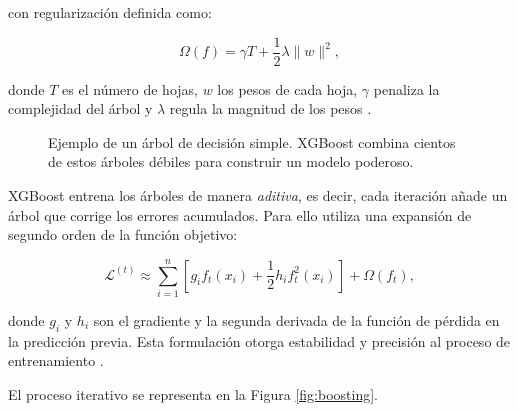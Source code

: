 con regularización definida como:

\begin{equation} 
\Omega(f) = \gamma T + \frac{1}{2}\lambda \|w\|^2, 
\end{equation}

donde $T$ es el número de hojas, $w$ los pesos de cada hoja, $\gamma$ penaliza la complejidad del árbol y $\lambda$ regula la magnitud de los pesos \cite{chen2016xgboost}.


\begin{figure}[H] 
\centering 
{} 
\caption{Ejemplo de un árbol de decisión simple. XGBoost combina cientos de estos árboles débiles para construir un modelo poderoso.} 
\label{fig:treeexample} 
\end{figure}

XGBoost entrena los árboles de manera \textit{aditiva}, es decir, cada iteración añade un árbol que corrige los errores acumulados. Para ello utiliza una expansión de segundo orden de la función objetivo:

\begin{equation} 
\mathcal{L}^{(t)} \approx \sum_{i=1}^n \left[ g_i f_t(x_i) + \frac{1}{2} h_i f_t^2(x_i) \right] + \Omega(f_t), 
\end{equation}

donde $g_i$ y $h_i$ son el gradiente y la segunda derivada de la función de pérdida en la predicción previa. Esta formulación otorga estabilidad y precisión al proceso de entrenamiento \cite{chen2016xgboost}.


El proceso iterativo se representa en la Figura \ref{fig:boosting}.

